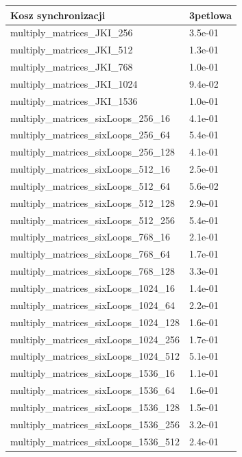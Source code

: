\documentclass{scrartcl}
\begin{document}
\begin{table}[H]
\begin{tabular}{|l|l|}
\hline
Kosz synchronizacji           & 3petlowa \\ \hline
multiply\_matrices\_JKI\_256  & 3.5e-01  \\ \hline
multiply\_matrices\_JKI\_512  & 1.3e-01  \\ \hline
multiply\_matrices\_JKI\_768  & 1.0e-01  \\ \hline
multiply\_matrices\_JKI\_1024 & 9.4e-02  \\ \hline
multiply\_matrices\_JKI\_1536 & 1.0e-01  \\ \hline
multiply\_matrices\_sixLoops\_256\_16   & 4.1e-01  \\ \hline
multiply\_matrices\_sixLoops\_256\_64   & 5.4e-01  \\ \hline
multiply\_matrices\_sixLoops\_256\_128  & 4.1e-01  \\ \hline
multiply\_matrices\_sixLoops\_512\_16   & 2.5e-01  \\ \hline
multiply\_matrices\_sixLoops\_512\_64   & 5.6e-02  \\ \hline
multiply\_matrices\_sixLoops\_512\_128  & 2.9e-01  \\ \hline
multiply\_matrices\_sixLoops\_512\_256  & 5.4e-01  \\ \hline
multiply\_matrices\_sixLoops\_768\_16   & 2.1e-01  \\ \hline
multiply\_matrices\_sixLoops\_768\_64   & 1.7e-01  \\ \hline
multiply\_matrices\_sixLoops\_768\_128  & 3.3e-01  \\ \hline
multiply\_matrices\_sixLoops\_1024\_16  & 1.4e-01  \\ \hline
multiply\_matrices\_sixLoops\_1024\_64  & 2.2e-01  \\ \hline
multiply\_matrices\_sixLoops\_1024\_128 & 1.6e-01  \\ \hline
multiply\_matrices\_sixLoops\_1024\_256 & 1.7e-01  \\ \hline
multiply\_matrices\_sixLoops\_1024\_512 & 5.1e-01  \\ \hline
multiply\_matrices\_sixLoops\_1536\_16  & 1.1e-01  \\ \hline
multiply\_matrices\_sixLoops\_1536\_64  & 1.6e-01  \\ \hline
multiply\_matrices\_sixLoops\_1536\_128 & 1.5e-01  \\ \hline
multiply\_matrices\_sixLoops\_1536\_256 & 3.2e-01  \\ \hline
multiply\_matrices\_sixLoops\_1536\_512 & 2.4e-01  \\ \hline
\end{tabular}
\end{table}
\end{document}
